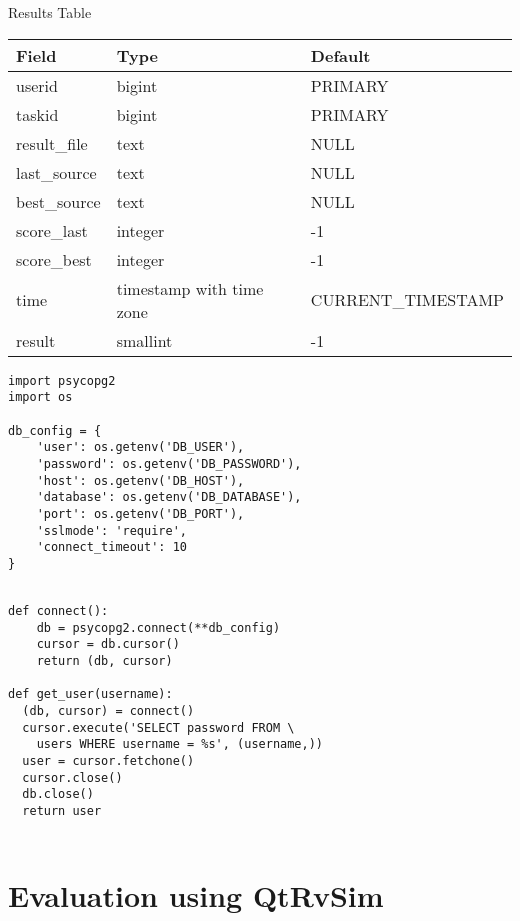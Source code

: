 \documentclass{beamer}
\begin{document}
		\begin{frame}{Results Table}
			\small
			\centering
			\begin{tabular}{|l|l|l|}
			\hline
			Field & Type & Default \\
			\hline
			userid & bigint & PRIMARY \\
			taskid & bigint & PRIMARY \\
			result\_file & text & NULL \\
			last\_source & text & NULL \\
			best\_source & text & NULL \\
			score\_last & integer & -1 \\
			score\_best & integer & -1 \\
			time & timestamp with time zone & CURRENT\_TIMESTAMP \\
			result & smallint & -1 \\
			\hline
			\end{tabular}
		\end{frame}

		\begin{frame}[fragile]
			\begin{verbatim}
import psycopg2
import os

db_config = {
	'user': os.getenv('DB_USER'),
	'password': os.getenv('DB_PASSWORD'),
	'host': os.getenv('DB_HOST'),
	'database': os.getenv('DB_DATABASE'),
	'port': os.getenv('DB_PORT'),
	'sslmode': 'require',
	'connect_timeout': 10
}
			\end{verbatim}
		\end{frame}

		\begin{frame}[fragile]
			\begin{verbatim}

def connect():
	db = psycopg2.connect(**db_config)
	cursor = db.cursor()
	return (db, cursor)

def get_user(username):
  (db, cursor) = connect()
  cursor.execute('SELECT password FROM \
	users WHERE username = %s', (username,))
  user = cursor.fetchone()
  cursor.close()
  db.close()
  return user
	
			\end{verbatim}
		\end{frame}

		\section{Evaluation using QtRvSim}
\end{document}
